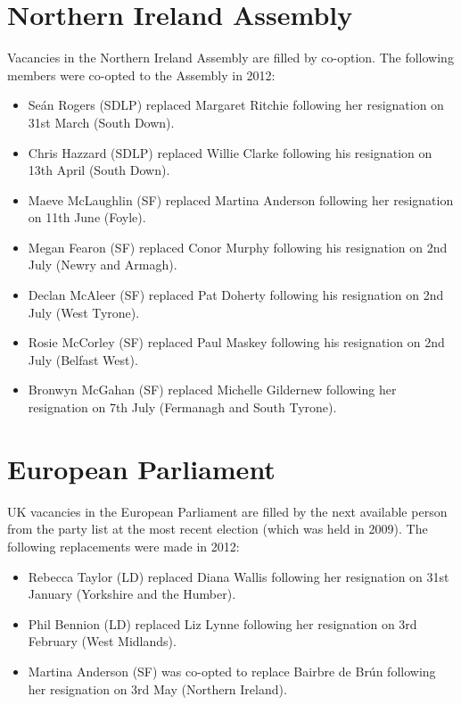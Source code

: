 \section{Northern Ireland Assembly}

Vacancies in the Northern Ireland Assembly are filled by co-option.  %
%
The following members were co-opted to the Assembly in 2012:
\begin{itemize}
\item Seán Rogers (SDLP) replaced Margaret Ritchie following her resignation on 31st March (South Down).
\item Chris Hazzard (SDLP) replaced Willie Clarke following his resignation on 13th April (South Down).
\item Maeve McLaughlin (SF) replaced Martina Anderson following her resignation on 11th June (Foyle).
\item Megan Fearon (SF) replaced Conor Murphy following his resignation on 2nd July (Newry and Armagh).
\item Declan McAleer (SF) replaced Pat Doherty following his resignation on 2nd July (West Tyrone).
\item Rosie McCorley (SF) replaced Paul Maskey following his resignation on 2nd July (Belfast West).
\item Bronwyn McGahan (SF) replaced Michelle Gildernew following her resignation on 7th July (Fermanagh and South Tyrone).
\end{itemize}

\section{European Parliament}

UK vacancies in the European Parliament are filled by the next available person from the party list at the most recent election (which was held in 2009). 
The following replacements were made in 2012:
\begin{itemize}
\item Rebecca Taylor (LD) replaced Diana Wallis following her resignation on 31st January (Yorkshire and the Humber).
\item Phil Bennion (LD) replaced Liz Lynne following her resignation on 3rd February (West Midlands).
\item Martina Anderson (SF) was co-opted to replace Bairbre de Brún following her resignation on 3rd May (Northern Ireland).
\end{itemize}

